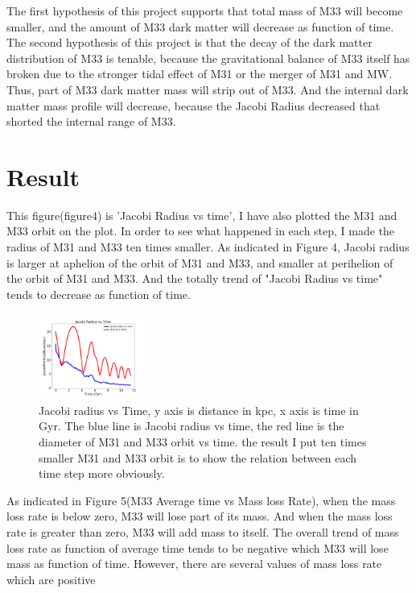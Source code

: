 \documentclass[twocolumn]{aastex63}
\begin{document}
\indent The first hypothesis of this project supports that total mass of M33 will become smaller, and the amount of M33 dark matter will decrease as function of time. The second hypothesis of this project is that the decay of the dark matter distribution of M33 is tenable, because the gravitational balance of M33 itself has broken due to the stronger tidal effect of M31 or the merger of M31 and MW. Thus, part of M33 dark matter mass will strip out of M33. And the internal dark matter mass profile will decrease, because the Jacobi Radius decreased that shorted the internal range of M33.  

\section{Result} 
\indent This figure(figure4) is 'Jacobi Radius vs time', I have also plotted the M31 and M33 orbit on the plot. In order to see what happened in each step, I made the radius of M31 and M33 ten times smaller. As indicated in Figure 4, Jacobi radius is larger at aphelion of the orbit of M31 and M33,  and smaller at perihelion of the orbit of M31 and M33. And the totally trend of "Jacobi Radius vs time" tends to decrease as function of time. 
\begin{figure}[H]
    \centering
    \includegraphics[width=3.5cm]{JacobiRadiusVSTime.png}
    \caption{Jacobi radius vs Time, y axis is distance in kpc, x axis is time in Gyr. The blue line is Jacobi radius vs time, the red line is the diameter of M31 and M33 orbit vs time. the result I put ten times smaller M31 and M33 orbit is to show the relation between each time step more obviously.}
\end{figure}

As indicated in Figure 5(M33 Average time vs Mass loss Rate), when the mass loss rate is below zero, M33 will lose part of its mass. And when the mass loss rate is greater than zero, M33 will add mass to itself. The overall trend of mass loss rate as function of average time tends to be negative which M33 will lose mass as function of time. However, there are several values of mass loss rate which are positive   \\
\end{document}

